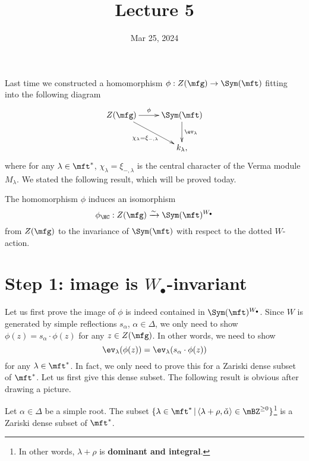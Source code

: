 





\title{Lecture 5}

\date{Mar 25, 2024}

\maketitle


	Last time we constructed a homomorphism $\phi: Z(\mfg) \to \Sym(\mft)$ fitting into the following diagram
	\begin{equation}
		\label{eqn-phi}
		\xymatrix{
			Z(\mfg) 
				\ar[r]^-\phi
				\ar[rd]_-{\chi_\lambda=\xi_{-,\lambda}}
			& \Sym(\mft) \ar[d]^-{\ev_\lambda} \\
			& k_\lambda,
		}
	\end{equation}
	where for any $\lambda\in \mft^*$, $\chi_\lambda=\xi_{-,\lambda}$ is the central character of the Verma module $M_\lambda$. We stated the following result, which will be proved today.

	\begin{thm}
	\label{thm-HC}
		The homomorphism $\phi$ induces an isomorphism
		\[
			\phi_\HC: Z(\mfg)  \xrightarrow{\sim} \Sym(\mft)^{W_\bullet}
		\]
		from $Z(\mfg)$ to the invariance of $\Sym(\mft)$ with respect to the dotted $W$-action.

	\end{thm}

\section{Step 1: image is \texorpdfstring{$W_\bullet$}{W.}-invariant}

	Let us first prove the image of $\phi$ is indeed contained in $\Sym(\mft)^{W_\bullet}$. Since $W$ is generated by simple reflections $s_\alpha$, $\alpha\in \Delta$, we only need to show $\phi(z) = s_\alpha \cdot \phi(z)$ for any $z\in Z(\mfg)$. In other words, we need to show
	\begin{equation}
		\label{eqn-1}
		\ev_\lambda(\phi(z)) = \ev_\lambda(s_\alpha \cdot \phi(z))
	\end{equation}
	for any $\lambda\in \mft^*$. In fact, we only need to prove this for a Zariski dense subset of $\mft^*$. Let us first give this dense subset. The following result is obvious after drawing a picture.

	\begin{lem}
		Let $\alpha\in \Delta$ be a simple root. The subset $\{ \lambda\in \mft^*\,\vert\, \langle \lambda+\rho, \check\alpha \rangle \in \mBZ^{\ge 0} \}$\footnote{In other words, $\lambda+\rho$ is \textbf{dominant and integral}.} is a Zariski dense subset of $\mft^*$.
	\end{lem}

